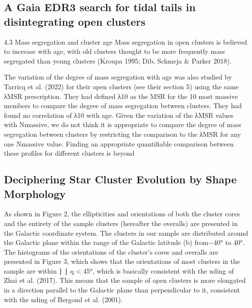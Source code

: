 \documentclass[../Main.tex]{subfiles}
\begin{document}
{\subsection{A Gaia EDR3 search for tidal tails in disintegrating open clusters}

4.3 Mass segregation and cluster age
Mass segregation in open clusters is believed to increase with age,
with old clusters thought to be more frequently mass segregated than
young clusters (Kroupa 1995; Dib, Schmeja & Parker 2018). 

The variation of the degree of mass segregation with age was also
studied by Tarricq et al. (2022) for their open clusters (see their
section 5) using the same λMSR prescription. They had defined λ10
as the MSR for the 10 most massive members to compare the degree
of mass segregation between clusters. They had found no correlation
of λ10 with age. Given the variation of the λMSR values with Nmassive,
we do not think it is appropriate to compare the degree of mass
segregation between clusters by restricting the comparison to the
λMSR for any one Nmassive value. Finding an appropriate quantifiable
comparison between these profiles for different clusters is beyond

\subsection{Deciphering Star Cluster Evolution by Shape Morphology}

As shown in Figure 2, the ellipticities and orientations of both
the cluster cores and the entirety of the sample clusters (hereafter
the overalls) are presented in the Galactic coordinate system. The
clusters in our sample are distributed around the Galactic plane
within the range of the Galactic latitude (b) from−40° to 40°. The
histograms of the orientations of the cluster’s cores and overalls
are presented in Figure 3, which shows that the orientations of
most clusters in the sample are within ∣ ∣ q <45°, which is basically
consistent with the nding of Zhai et al. (2017). This means that
the sample of open clusters is more elongated in a direction
parallel to the Galactic plane than perpendicular to it, consistent
with the nding of Bergond et al. (2001).

}
\end{document}
